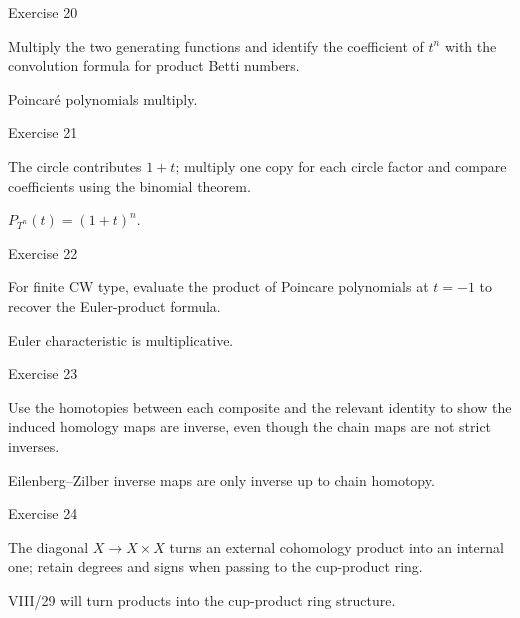 \begin{exercise}\label{exr:viii27-20}
Exercise 20
\end{exercise}
\begin{hint}
Multiply the two generating functions and identify the coefficient of \(t^n\) with the convolution formula for product Betti numbers.
\end{hint}
\begin{solution}
Poincaré polynomials multiply.
\end{solution}

\begin{exercise}\label{exr:viii27-21}
Exercise 21
\end{exercise}
\begin{hint}
The circle contributes \(1+t\); multiply one copy for each circle factor and compare coefficients using the binomial theorem.
\end{hint}
\begin{solution}
\(P_{T^n}(t)=(1+t)^n\).
\end{solution}

\begin{exercise}\label{exr:viii27-22}
Exercise 22
\end{exercise}
\begin{hint}
For finite CW type, evaluate the product of Poincare polynomials at \(t=-1\) to recover the Euler-product formula.
\end{hint}
\begin{solution}
Euler characteristic is multiplicative.
\end{solution}

\begin{exercise}\label{exr:viii27-23}
Exercise 23
\end{exercise}
\begin{hint}
Use the homotopies between each composite and the relevant identity to show the induced homology maps are inverse, even though the chain maps are not strict inverses.
\end{hint}
\begin{solution}
Eilenberg--Zilber inverse maps are only inverse up to chain homotopy.
\end{solution}

\begin{exercise}\label{exr:viii27-24}
Exercise 24
\end{exercise}
\begin{hint}
The diagonal \(X\to X\times X\) turns an external cohomology product into an internal one; retain degrees and signs when passing to the cup-product ring.
\end{hint}
\begin{solution}
VIII/29 will turn products into the cup-product ring structure.
\end{solution}


